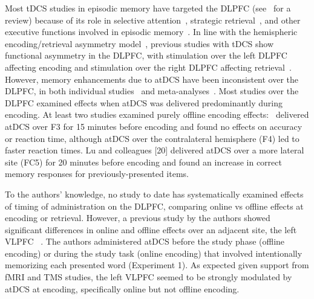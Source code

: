 \documentclass[10pt,letterpaper]{article}
\begin{document}
Most tDCS studies in episodic memory have targeted the DLPFC (see~\cite{manenti2012transcranial} for a review) because of its role in selective attention~\cite{szczepanski2014insights}, strategic retrieval~\cite{fuster2000executive}, and other executive functions involved in episodic memory~\cite{habich2017anodal}. In line with the hemispheric encoding/retrieval asymmetry model~\cite{nyberg1996pet}, previous studies with tDCS show functional asymmetry in the DLPFC, with stimulation over the left DLPFC affecting encoding and stimulation over the right DLPFC affecting retrieval~\cite{javadi2013transcranial, javadi2012transcranial, manenti2013enhancing}. However, memory enhancements due to atDCS have been inconsistent over the DLPFC, in both individual studies~\cite{lara2017anodal, javadi2013transcranial, javadi2012transcranial, habich2017anodal, zwissler2014shaping} and meta-analyses~\cite{brunoni2014working, dedoncker2016systematic, dedoncker2016effect}. Most studies over the DLPFC examined effects when atDCS was delivered predominantly during encoding. At least two studies examined purely offline encoding effects:~\cite{lafontaine2013transcranial} delivered atDCS over F3 for 15 minutes before encoding and found no effects on accuracy or reaction time, although atDCS over the contralateral hemisphere (F4) led to faster reaction times.  Lu and colleagues [20] delivered atDCS over a more lateral site (FC5) for 20 minutes before encoding and found an increase in correct memory responses for previously-presented items.

To the authors’ knowledge, no study to date has systematically examined effects of timing of administration on the DLPFC, comparing online vs offline effects at encoding or retrieval. However, a previous study by the authors showed significant differences in online and offline effects over an adjacent site, the left VLPFC ~\cite{medvedeva2019effects}.  The authors administered atDCS before the study phase (offline encoding) or during the study task (online encoding) that involved intentionally memorizing each presented word (Experiment 1).  As expected given support from fMRI and TMS studies, the left
VLPFC seemed to be strongly modulated by atDCS at encoding, specifically online but not offline encoding.
 
\end{document}
